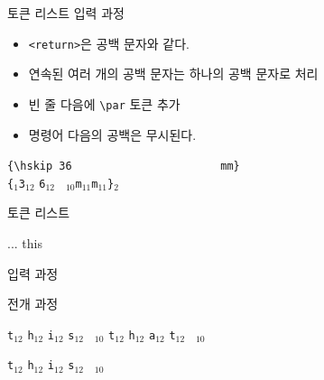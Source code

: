 \documentclass{beamer}
\begin{document}
%
\begin{frame}[fragile]{토큰 리스트}
  \alert{입력 과정}

  \begin{itemize}
  \item \verb+<return>+은 공백 문자와 같다.
  \item 연속된 여러 개의 공백 문자는 하나의 공백 문자로 처리
  \item 빈 줄 다음에 \verb+\par+ 토큰 추가
  \item 명령어 다음의 공백은 무시된다.
  \end{itemize}
  
  \verb*+{\hskip 36                       mm}+\\
  \bigskip
  \verb|{|$_1$\quad{}\quad\verb|3|$_{12}$
  \quad\verb|6|$_{12}$\quad
  \verb*| |$_{10}$\quad\verb|m|$_{11}$\quad\verb|m|$_{11}$\quad\verb|}|$_{2}$
\end{frame}


%
\begin{frame}[fragile]{토큰 리스트}
  \begin{Verbatim*}
\def\tokentwo{\iftrue this \else that \fi}
...
\tokentwo
  \end{Verbatim*}
  
  \bigskip
  \alert{입력 과정}
  
  
  \bigskip
  \alert{전개 과정}
  
  \quad
  \verb|t|$_{12}$\quad
  \verb|h|$_{12}$\quad
  \verb|i|$_{12}$\quad
  \verb|s|$_{12}$\quad
  \verb*| |$_{10}$\quad
  \quad
  \verb|t|$_{12}$\quad
  \verb|h|$_{12}$\quad
  \verb|a|$_{12}$\quad
  \verb|t|$_{12}$\quad
  \verb*| |$_{10}$\quad
  
  \bigskip
  \verb|t|$_{12}$\quad
  \verb|h|$_{12}$\quad
  \verb|i|$_{12}$\quad
  \verb|s|$_{12}$\quad
  \verb*| |$_{10}$\quad
\end{frame}
\end{document}
